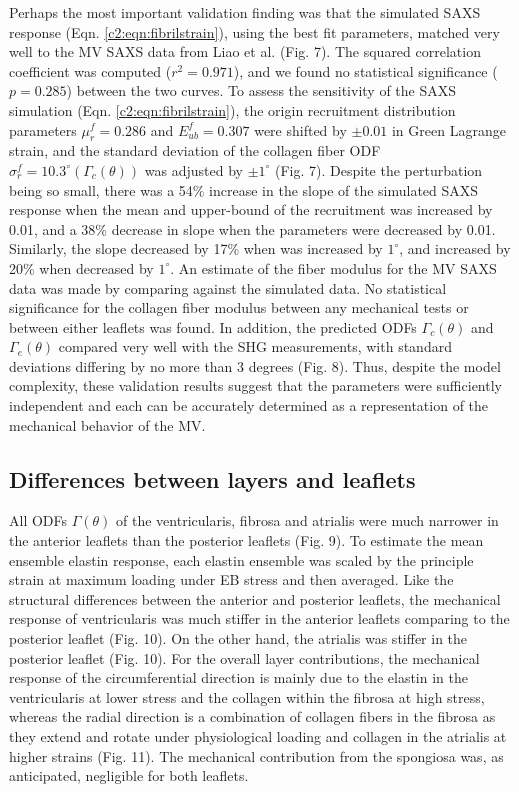     Perhaps the most important validation finding was that the simulated SAXS response (Eqn. \ref{c2:eqn:fibrilstrain}), using the best fit parameters, matched very well to the MV SAXS data from Liao et al. \cite{liao_relation_2007} (Fig. 7). The squared correlation coefficient was computed ($r^2 = 0.971$), and we found no statistical significance ($p = 0.285$) between the two curves. To assess the sensitivity of the SAXS simulation (Eqn. \ref{c2:eqn:fibrilstrain}), the origin recruitment distribution parameters $\mu_r^f = 0.286$ and $E_{ub}^f = 0.307 $ were shifted by $\pm0.01$ in Green Lagrange strain, and the standard deviation of the collagen fiber ODF $\sigma_r^f = 10.3^\circ (\Gamma_c(\theta))$ was adjusted by $\pm1^\circ$ (Fig. 7). Despite the perturbation being so small, there was a 54\% increase in the slope of the simulated SAXS response when the mean and upper-bound of the recruitment was increased by 0.01, and a 38\% decrease in slope when the parameters were decreased by 0.01. Similarly, the slope decreased by 17\% when  was increased by $1^\circ$, and increased by 20\% when decreased by $1^\circ$. 
    An estimate of the fiber modulus for the MV SAXS data was made by comparing against the simulated data. No statistical significance for the collagen fiber modulus between any mechanical tests or between either leaflets was found. In addition, the predicted ODFs $\Gamma_c(\theta)$ and $\Gamma_e(\theta)$ compared very well with the SHG measurements, with standard deviations differing by no more than 3 degrees (Fig. 8). Thus, despite the model complexity, these validation results suggest that the parameters were sufficiently independent and each can be accurately determined as a representation of the mechanical behavior of the MV.
    
    
\subsection{Differences between layers and leaflets}

    All ODFs $\Gamma(\theta)$ of the ventricularis, fibrosa and atrialis were much narrower in the anterior leaflets than the posterior leaflets (Fig. 9). To estimate the mean ensemble elastin response, each elastin ensemble was scaled by the principle strain at maximum loading under EB stress and then averaged. Like the structural differences between the anterior and posterior leaflets, the mechanical response of ventricularis was much stiffer in the anterior leaflets comparing to the posterior leaflet (Fig. 10). On the other hand, the atrialis was stiffer in the posterior leaflet (Fig. 10). For the overall layer contributions, the mechanical response of the circumferential direction is mainly due to the elastin in the ventricularis at lower stress and the collagen within the fibrosa at high stress, whereas the radial direction is a combination of collagen fibers in the fibrosa as they extend and rotate under physiological loading and collagen in the atrialis at higher strains (Fig. 11). The mechanical contribution from the spongiosa was, as anticipated, negligible for both leaflets.
    
    
    


